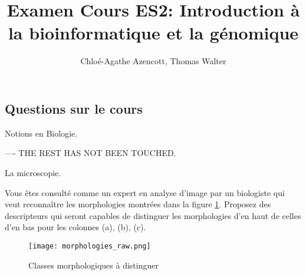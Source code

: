 \documentclass[11pt,addpoints]{exam}
\title{Examen Cours ES2: Introduction à la bioinformatique et la génomique}
\author{Chloé-Agathe Azencott, Thomas Walter}
\begin{document}
\maketitle 

\begin{questions}

\section{Questions sur le cours}

\question[4] Notions en Biologie. 

---- THE REST HAS NOT BEEN TOUCHED. 

\question[2] La microscopie.

\question[2] Vous êtes consulté comme un expert en analyse d'image par
un biologiste qui veut reconnaître les morphologies montrées dans la
figure \ref{fig:morphologies}. Proposez des descripteurs qui seront
capables de distinguer les
morphologies d'en haut de celles d'en bas pour les colonnes (a), (b),
(c). 
\begin{figure}[h!]
\centering
\texttt{[image: morphologies\_raw.png]}
\caption{Classes morphologiques à distinguer}
\label{fig:morphologies}
\end{figure}


\end{questions}
\end{document}
